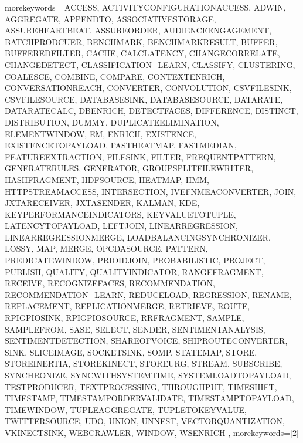 
%
   {morekeywords={%
ACCESS, ACTIVITYCONFIGURATIONACCESS, ADWIN, AGGREGATE, APPENDTO, ASSOCIATIVESTORAGE, ASSUREHEARTBEAT, ASSUREORDER, AUDIENCEENGAGEMENT, BATCHPRODCUER, BENCHMARK, BENCHMARKRESULT, BUFFER, BUFFEREDFILTER, CACHE, CALCLATENCY, CHANGECORRELATE, CHANGEDETECT, CLASSIFICATION_LEARN, CLASSIFY, CLUSTERING, COALESCE, COMBINE, COMPARE, CONTEXTENRICH, CONVERSATIONREACH, CONVERTER, CONVOLUTION, CSVFILESINK, CSVFILESOURCE, DATABASESINK, DATABASESOURCE, DATARATE, DATARATECALC, DBENRICH, DETECTFACES, DIFFERENCE, DISTINCT, DISTRIBUTION, DUMMY, DUPLICATEELIMINATION, ELEMENTWINDOW, EM, ENRICH, EXISTENCE, EXISTENCETOPAYLOAD, FASTHEATMAP, FASTMEDIAN, FEATUREEXTRACTION, FILESINK, FILTER, FREQUENTPATTERN, GENERATERULES, GENERATOR, GROUPSPLITFILEWRITER, HASHFRAGMENT, HDFSOURCE, HEATMAP, HMM, HTTPSTREAMACCESS, INTERSECTION, IVEFNMEACONVERTER, JOIN, JXTARECEIVER, JXTASENDER, KALMAN, KDE, KEYPERFORMANCEINDICATORS, KEYVALUETOTUPLE, LATENCYTOPAYLOAD, LEFTJOIN, LINEARREGRESSION, LINEARREGRESSIONMERGE, LOADBALANCINGSYNCHRONIZER, LOSSY, MAP, MERGE, OPCDASOURCE, PATTERN, PREDICATEWINDOW, PRIOIDJOIN, PROBABILISTIC, PROJECT, PUBLISH, QUALITY, QUALITYINDICATOR, RANGEFRAGMENT, RECEIVE, RECOGNIZEFACES, RECOMMENDATION, RECOMMENDATION_LEARN, REDUCELOAD, REGRESSION, RENAME, REPLACEMENT, REPLICATIONMERGE, RETRIEVE, ROUTE, RPIGPIOSINK, RPIGPIOSOURCE, RRFRAGMENT, SAMPLE, SAMPLEFROM, SASE, SELECT, SENDER, SENTIMENTANALYSIS, SENTIMENTDETECTION, SHAREOFVOICE, SHIPROUTECONVERTER, SINK, SLICEIMAGE, SOCKETSINK, SOMP, STATEMAP, STORE, STOREINERTIA, STOREKINECT, STOREURG, STREAM, SUBSCRIBE, SYNCHRONIZE, SYNCWITHSYSTEMTIME, SYSTEMLOADTOPAYLOAD, TESTPRODUCER, TEXTPROCESSING, THROUGHPUT, TIMESHIFT, TIMESTAMP, TIMESTAMPORDERVALIDATE, TIMESTAMPTOPAYLOAD, TIMEWINDOW, TUPLEAGGREGATE, TUPLETOKEYVALUE, TWITTERSOURCE, UDO, UNION, UNNEST, VECTORQUANTIZATION, VKINECTSINK, WEBCRAWLER, WINDOW, WSENRICH%
      },%
   morekeywords=[2]{%
}}
